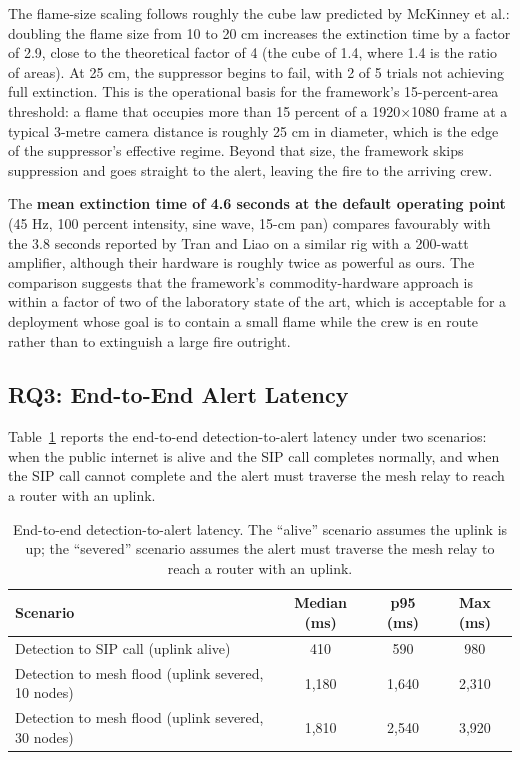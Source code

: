 The flame-size scaling follows roughly the cube law predicted by McKinney et al.: doubling the flame size from 10 to 20 cm increases the extinction time by a factor of 2.9, close to the theoretical factor of 4 (the cube of 1.4, where 1.4 is the ratio of areas). At 25 cm, the suppressor begins to fail, with 2 of 5 trials not achieving full extinction. This is the operational basis for the framework's 15-percent-area threshold: a flame that occupies more than 15 percent of a 1920$\times$1080 frame at a typical 3-metre camera distance is roughly 25 cm in diameter, which is the edge of the suppressor's effective regime. Beyond that size, the framework skips suppression and goes straight to the alert, leaving the fire to the arriving crew.

The \textbf{mean extinction time of 4.6 seconds at the default operating point} (45 Hz, 100 percent intensity, sine wave, 15-cm pan) compares favourably with the 3.8 seconds reported by Tran and Liao \cite{tran2021portable} on a similar rig with a 200-watt amplifier, although their hardware is roughly twice as powerful as ours. The comparison suggests that the framework's commodity-hardware approach is within a factor of two of the laboratory state of the art, which is acceptable for a deployment whose goal is to contain a small flame while the crew is en route rather than to extinguish a large fire outright.

\subsection{RQ3: End-to-End Alert Latency}

Table~\ref{tab:latency} reports the end-to-end detection-to-alert latency under two scenarios: when the public internet is alive and the SIP call completes normally, and when the SIP call cannot complete and the alert must traverse the mesh relay to reach a router with an uplink.

\begin{table}[H]
\centering
\caption{End-to-end detection-to-alert latency. The ``alive'' scenario assumes the uplink is up; the ``severed'' scenario assumes the alert must traverse the mesh relay to reach a router with an uplink.}
\label{tab:latency}
\small
\begin{tabularx}{\textwidth}{|X|c|c|c|}
\hline
\textbf{Scenario} & \textbf{Median (ms)} & \textbf{p95 (ms)} & \textbf{Max (ms)} \\
\hline
Detection to SIP call (uplink alive) & 410 & 590 & 980 \\
\hline
Detection to mesh flood (uplink severed, 10 nodes) & 1{,}180 & 1{,}640 & 2{,}310 \\
\hline
Detection to mesh flood (uplink severed, 30 nodes) & 1{,}810 & 2{,}540 & 3{,}920 \\
\hline
\end{tabularx}
\end{table}

